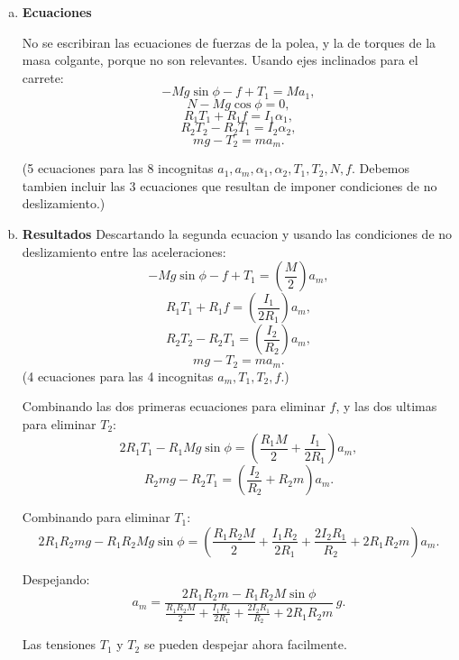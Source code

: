 \begin{enumerate}[a)]
\item \textbf{Ecuaciones}

No se escribiran las ecuaciones de fuerzas de la polea, y la de torques de la masa colgante, porque no son relevantes. Usando ejes inclinados para el carrete:
\[
-Mg\sin\phi-f+T_1=Ma_1,
\]
\[
N-Mg\cos\phi=0,
\]
\[
R_1T_1+R_1f=I_1\alpha_1,
\]
\[
R_2T_2-R_2T_1=I_2\alpha_2,
\]
\[
mg-T_2=ma_m.
\]

(5 ecuaciones para las 8 incognitas $a_1,a_m,\alpha_1,\alpha_2,T_1,T_2,N,f$. Debemos tambien incluir las 3 ecuaciones que resultan de imponer condiciones de no deslizamiento.)


\item \textbf{Resultados}
Descartando la segunda ecuacion y usando las condiciones de no deslizamiento entre las aceleraciones:
\[
-Mg\sin\phi-f+T_1=\left(\frac{M}{2}\right)a_m,
\]
\[
R_1T_1+R_1f=\left(\frac{I_1}{2R_1}\right)a_m,
\]
\[
R_2T_2-R_2T_1=\left(\frac{I_2}{R_2}\right)a_m,
\]
\[
mg-T_2=ma_m.
\]
(4 ecuaciones para las 4 incognitas $a_m,T_1,T_2,f$.)

Combinando las dos primeras ecuaciones para eliminar $f$, y las dos ultimas para eliminar $T_2$:
\[
2R_1T_1-R_1Mg\sin\phi=\left(\frac{R_1M}{2}+\frac{I_1}{2R_1}\right)a_m,
\]
\[
R_2mg-R_2T_1=\left(\frac{I_2}{R_2}+R_2m\right)a_m.
\]

Combinando para eliminar $T_1$:
\[
2R_1R_2mg-R_1R_2Mg\sin\phi=
\left(\frac{R_1R_2M}{2}+\frac{I_1R_2}{2R_1}+\frac{2I_2R_1}{R_2}+2R_1R_2m\right)a_m.
\]

Despejando:
\[
a_m=
\frac{2R_1R_2m-R_1R_2M\sin\phi}{\frac{R_1R_2M}{2}+\frac{I_1R_2}{2R_1}+\frac{2I_2R_1}{R_2}+2R_1R_2m}\,g.
\]

Las tensiones $T_1$ y $T_2$ se pueden despejar ahora facilmente.
\end{enumerate}
